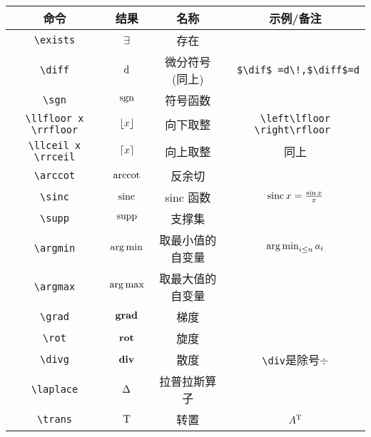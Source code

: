 \documentclass[lang=cn,12pt,scheme=chinese,mode=simple,black]{elegantbook}
\begin{document}
\begin{center}
    \setlength{\tabcolsep}{10pt}
    \begin{tabular}{|c|c|c|c|}
        \hline
        \textbf{命令}              & \textbf{结果}         & \textbf{名称}    & \textbf{示例/备注}                 \\
        \hline
        \verb|\exists|             & $\exists$             & 存在             &                                    \\
        \verb|\diff|               & $\diff$               & 微分符号 (同上)  & \verb| $\dif$ =d\!,$\diff$=d  |    \\
        \verb|\sgn|                & $\sgn$                & 符号函数         &                                    \\
        \verb|\llfloor x \rrfloor| & $\llfloor x \rrfloor$ & 向下取整         & \verb|\left\lfloor \right\rfloor | \\
        \verb|\llceil x \rrceil|   & $\llceil x \rrceil$   & 向上取整         & 同上                               \\
        \verb|\arccot|             & $\arccot$             & 反余切           &                                    \\
        \verb|\sinc|               & $\sinc$               & sinc 函数        & $\sinc x = \frac{\sin x}{x}$       \\
        \verb|\supp|               & $\supp$               & 支撑集           &                                    \\
        \verb|\argmin|             & $\argmin$             & 取最小值的自变量 & $\argmin_{i \le n} a_i$            \\
        \verb|\argmax|             & $\argmax$             & 取最大值的自变量 &                                    \\
        \verb|\grad|               & $\grad$               & 梯度             &                                    \\
        \verb|\rot|                & $\rot$                & 旋度             &                                    \\
        \verb|\divg|               & $\divg$               & 散度             & \verb|\div|是除号$\div$            \\
        \verb|\laplace|            & $\laplace$            & 拉普拉斯算子     &                                    \\
        \verb|\trans|              & $\trans$              & 转置             & $A^{\trans}$                       \\

\end{tabular}
\end{center}
\end{document}
